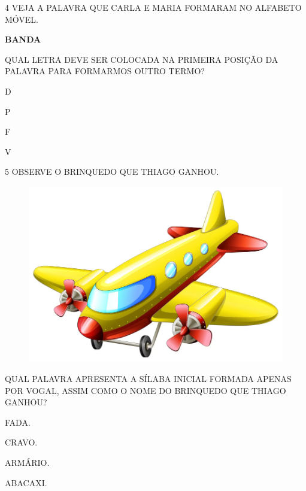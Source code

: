 \num{4} VEJA A PALAVRA QUE CARLA E MARIA FORMARAM NO ALFABETO MÓVEL.

\begin{center}
\textbf{BANDA}
\end{center}

QUAL LETRA DEVE SER COLOCADA NA PRIMEIRA POSIÇÃO DA PALAVRA PARA FORMARMOS OUTRO TERMO?

\begin{escolha}

\item D

\item P

\item F

\item V

\end{escolha}

\num{5} OBSERVE O BRINQUEDO QUE THIAGO GANHOU.

\begin{figure}[H]
\centering
\includegraphics[width=.7\textwidth]{./media/image239.png}
\end{figure}

QUAL PALAVRA APRESENTA A SÍLABA INICIAL FORMADA APENAS POR VOGAL, ASSIM COMO O NOME DO BRINQUEDO QUE THIAGO GANHOU?

\begin{escolha}

\item FADA.

\item CRAVO.

\item ARMÁRIO.

\item ABACAXI.

\end{escolha}

